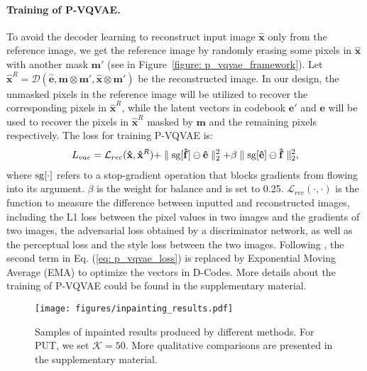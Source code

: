\documentclass[10pt,twocolumn,letterpaper]{article}
\newcommand{\Fref}[1]{Figure~\ref{#1}}
\begin{document}
\paragraph{Training of P-VQVAE.}
To avoid the decoder learning to reconstruct input image $\mathbf{\hat{x}}$ only from the reference image, we get the reference image by randomly erasing some pixels in $\mathbf{\hat{x}}$ with another mask $\mathbf{m'}$ (see in \Fref{figure: p_vqvae_framework}). Let $\mathbf{\hat{x}}^R = \mathcal{D}(\mathbf{\hat{e}}, \mathbf{m} \otimes \mathbf{m'}, \mathbf{\hat{x}} \otimes \mathbf{m'})$ be the reconstructed image. In our design, the unmasked pixels in the reference image will be utilized to recover the corresponding pixels in $\mathbf{\hat{x}}^R$, while the latent vectors in codebook $\mathbf{e}'$ and $\mathbf{e}$ will be used to recover the pixels in $\mathbf{\hat{x}}^R$ masked by $\mathbf{m}$ and the remaining pixels respectively. The loss for training P-VQVAE is:
\begin{equation}
\begin{aligned}
     L_{vae}= \mathcal{L}_{rec}(\mathbf{\hat{x}}, \mathbf{\hat{x}}^R) 
	 + \parallel {\rm sg}[\mathbf{\hat{f}}] \ominus \mathbf{\hat{e}} \parallel^2_2 
	 + \beta \parallel {\rm sg}[\mathbf{\hat{e}}] \ominus \mathbf{\hat{f}} \parallel^2_2,
\end{aligned}
\label{eq: p_vqvae_loss}
\end{equation}
where 
${\rm sg}[\cdot]$ refers to a stop-gradient operation that blocks gradients from flowing into its argument.
$\beta$ is the weight for balance and is set to 0.25. $\mathcal{L}_{rec}(\cdot, \cdot)$ is the function to measure the difference between inputted and reconstructed images, including the L1 loss between the pixel values in two images and the gradients of two images, the adversarial loss\cite{goodfellow2014generative} obtained by a discriminator network, as well as the perceptual loss \cite{johnson2016perceptual} and the style loss\cite{gatys2016image}  between the two images.
Following \cite{van2017neural,razavi2019generating}, the second term in Eq. (\ref{eq: p_vqvae_loss}) is replaced by Exponential Moving Average (EMA) to optimize the vectors in D-Codes. More details about the training of P-VQVAE could be found in the supplementary material.




\begin{figure*}[t]
	\centering
	\texttt{[image: figures/inpainting\_results.pdf]} 
    \vspace{-5pt}
	\caption{Samples of inpainted results produced by different methods. For PUT, we set $\mathcal{K}=50$. More qualitative comparisons are presented in the supplementary material.}
	\vspace{-8pt}
	\label{figure: inpainting_results}
\end{figure*}
\end{document}
